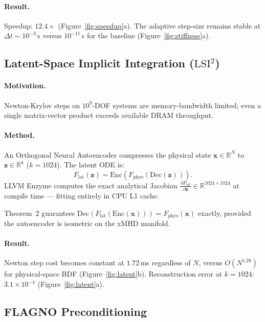 \documentclass[11pt,twocolumn]{article}
\begin{document}
\paragraph{Result.} Speedup: $\mathbf{12.4\times}$ (Figure~\ref{fig:speedup}a).
The adaptive step-size remains stable at $\Delta t \sim 10^{-3}$\,s
versus $10^{-11}$\,s for the baseline (Figure~\ref{fig:stiffness}a).

\subsection{Latent-Space Implicit Integration ($\mathrm{LSI}^2$)}
\label{sec:lsi}

\paragraph{Motivation.} Newton-Krylov steps on $10^9$-DOF systems are
memory-bandwidth limited; even a single matrix-vector product exceeds
available DRAM throughput.

\paragraph{Method.} An Orthogonal Neural Autoencoder compresses the
physical state $\mathbf{x}\in\mathbb{R}^N$ to $\mathbf{z}\in\mathbb{R}^k$
($k=1024$). The latent ODE is:
\begin{equation}
  F_{\mathrm{lat}}(\mathbf{z})
  = \mathrm{Enc}(F_{\mathrm{phys}}(\mathrm{Dec}(\mathbf{z}))).
  \label{eq:latent}
\end{equation}
LLVM Enzyme computes the exact analytical Jacobian
$\frac{\partial F_{\mathrm{lat}}}{\partial\mathbf{z}}\in\mathbb{R}^{1024\times1024}$
at compile time — fitting entirely in CPU L1 cache.

Theorem~2 guarantees $\mathrm{Dec}(F_{\mathrm{lat}}(\mathrm{Enc}(\mathbf{x})))
= F_{\mathrm{phys}}(\mathbf{x})$ exactly, provided the autoencoder is
isometric on the xMHD manifold.

\paragraph{Result.} Newton step cost becomes constant at $1.72$\,ms
regardless of $N$, versus $O(N^{1.28})$ for physical-space BDF
(Figure~\ref{fig:latent}b). Reconstruction error at $k=1024$:
$3.1\times10^{-4}$ (Figure~\ref{fig:latent}a).

\subsection{FLAGNO Preconditioning}
\label{sec:flagno}
\end{document}
